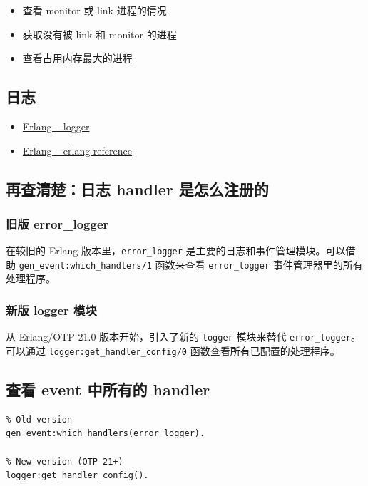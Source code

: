 \begin{itemize}[leftmargin=1.5em]
    \item 查看 monitor 或 link 进程的情况
    \item 获取没有被 link 和 monitor 的进程
    \item 查看占用内存最大的进程
\end{itemize}

\subsection{日志}

\begin{itemize}[leftmargin=1.5em]
    \item \href{https://www.erlang.org/doc/man/logger.html#macros}{Erlang -- logger}
    \item \href{https://www.erlang.org/doc/man/erlang#type-reference}{Erlang -- erlang reference}
\end{itemize}

\subsection{再查清楚：日志 handler 是怎么注册的}

\subsubsection{旧版 error\_logger}

在较旧的 Erlang 版本里，\lstinline|error_logger| 是主要的日志和事件管理模块。可以借助 \lstinline|gen_event:which_handlers/1| 函数来查看 \lstinline|error_logger| 事件管理器里的所有处理程序。

\subsubsection{新版 logger 模块}

从 Erlang/OTP 21.0 版本开始，引入了新的 \lstinline|logger| 模块来替代 \lstinline|error_logger|。可以通过 \lstinline|logger:get_handler_config/0| 函数查看所有已配置的处理程序。

\subsection{查看 event 中所有的 handler}

\begin{lstlisting}
% Old version
gen_event:which_handlers(error_logger).

% New version (OTP 21+)
logger:get_handler_config().
\end{lstlisting}
